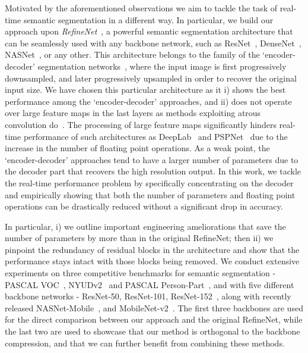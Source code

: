 \documentclass{bmvc2k}
\begin{document}
	Motivated by the aforementioned observations we aim to tackle the task of real-time semantic segmentation in a different way. In particular, we build our approach upon \textit{RefineNet}~\cite{LinMSR17}, a powerful semantic segmentation architecture that can be seamlessly used with any backbone network, such as ResNet~\cite{HeZRS16}, DenseNet~\cite{HuangLMW17}, NASNet~\cite{ZophVSL17}, or any other. This architecture belongs to the family of the `encoder-decoder' segmentation networks~\cite{PaszkeCKC16,BadrinarayananH15,NohHH15}, where the input image is first progressively downsampled, and later progressively upsampled in order to recover the original input size. We have chosen this particular architecture as it i) shows the best performance among the `encoder-decoder' approaches, and ii) does not operate over large feature maps in the last layers as methods exploiting atrous convolution do~\cite{ChenPKMY14,ChenPK0Y16,ChenPSA17,ZhaoSQWJ17,YuKF17}. The processing of large feature maps significantly hinders real-time performance of such architectures as DeepLab~\cite{ChenPKMY14,ChenPK0Y16,ChenPSA17} and PSPNet~\cite{ZhaoSQWJ17} due to the increase in the number of floating point operations. As a weak point, the `encoder-decoder' approaches tend to have a larger number of parameters due to the decoder part that recovers the high resolution output. In this work, we tackle the real-time performance problem by specifically concentrating on the decoder and empirically showing that both the number of parameters and floating point operations can be drastically reduced without a significant drop in accuracy.
	
	In particular, i) we outline important engineering ameliorations that save the number of parameters by more than  in the original RefineNet; then ii) we pinpoint the redundancy of residual blocks in the architecture and show that the performance stays intact with those blocks being removed. We conduct extensive experiments on three competitive benchmarks for semantic segmentation - PASCAL VOC~\cite{EveringhamGWWZ10}, NYUDv2~\cite{SilbermanHKF12} and PASCAL Person-Part~\cite{ChenMLFUY14,ChenYWXY16}, and with five different backbone networks - ResNet-50, ResNet-101, ResNet-152~\cite{HeZRS16}, along with recently released NASNet-Mobile~\cite{ZophVSL17}, and MobileNet-v2~\cite{abs-1801-04381}. The first three backbones are used for the direct comparison between our approach and the original RefineNet, while the last two are used to showcase that our method is orthogonal to the backbone compression, and that we can further benefit from combining these methods.
	
\end{document}
